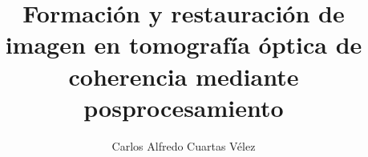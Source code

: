 \author{Carlos Alfredo Cuartas Vélez}
\title{Formación y restauración de imagen en tomografía óptica de coherencia mediante posprocesamiento}

\newcommand\portada{
	\begin{titlepage}
		\begin{center}
			\vfill
			{\large  TESIS DE MAESTRÍA\par}
			{\large Formación y restauración de imagen en tomografía óptica de coherencia mediante posprocesamiento}
			\vfill
			\vfill
			{\large  Carlos Alfredo Cuartas Vélez\\
			ccuarta1@eafit.edu.co \par}
			\vfill
			
			{\normalsize  Escuela de Ciencias \par}
			{\normalsize  Departamento de Ciencias Físicas \par}
			{\normalsize  Maestría en Física Aplicada \par}
			{\normalsize  Universidad EAFIT \par}
			{\normalsize  2017\par}
		\end{center}
	\end{titlepage}
}

\newcommand\contraportada{
	\begin{titlepage}
		\begin{center}
			{\large  FORMACIÓN Y RESTAURACIÓN DE IMAGEN EN TOMOGRAFÍA ÓPTICA DE COHERENCIA MEDIANTE POSPROCESAMIENTO}
			\vfill
			{\large  CARLOS ALFREDO CUARTAS VÉLEZ \par} %
			\vfill
			{\large  Tesis de Maestría presentada como requerimiento parcial para optar al título de Magíster en Física Aplicada}
			\vfill
			{\large Director \par} 
            {\large Ph.D. RENÉ RESTREPO GÓMEZ \par}
            {\normalsize Universidad EAFIT \par}
            \vfil
            \vspace{18pt}
            {\large  Co-director \par}
            {\large  Ph.D. NÉSTOR URIBE PATARROYO \par}                        
            {\normalsize Wellman Center for Photomedicine, Harvard Medical School and Massachusetts General Hospital \par}
			\vfill
			
			{\normalsize  ESCUELA DE CIENCIAS \par}
			{\normalsize  DEPARTAMENTO DE CIENCIAS FÍSICAS \par}
			{\normalsize  MAESTRÍA EN FÍSICA APLICADA \par}
			{\normalsize  UNIVERSIDAD EAFIT \par}
			{\normalsize  2017\par}
		\end{center}
\end{titlepage}
}

